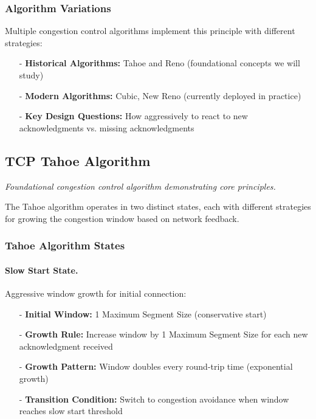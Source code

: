 \documentclass[../../compsys.tex]{subfiles}
\begin{document}
\subsubsection{Algorithm Variations}
Multiple congestion control algorithms implement this principle with different strategies:
\begin{itemize}
  \item[-] \textbf{Historical Algorithms:} Tahoe and Reno (foundational concepts we will study)
  \item[-] \textbf{Modern Algorithms:} Cubic, New Reno (currently deployed in practice)
  \item[-] \textbf{Key Design Questions:} How aggressively to react to new acknowledgments vs. missing acknowledgments
\end{itemize}

\subsection{TCP Tahoe Algorithm}
\textit{Foundational congestion control algorithm demonstrating core principles.}

The Tahoe algorithm operates in two distinct states, each with different strategies for growing the congestion window based on network feedback.

\subsubsection{Tahoe Algorithm States}

\paragraph{Slow Start State.} Aggressive window growth for initial connection:
\begin{itemize}
  \item[-] \textbf{Initial Window:} 1 Maximum Segment Size (conservative start)
  \item[-] \textbf{Growth Rule:} Increase window by 1 Maximum Segment Size for each new acknowledgment received
  \item[-] \textbf{Growth Pattern:} Window doubles every round-trip time (exponential growth)
  \item[-] \textbf{Transition Condition:} Switch to congestion avoidance when window reaches slow start threshold
\end{itemize}
\end{document}
